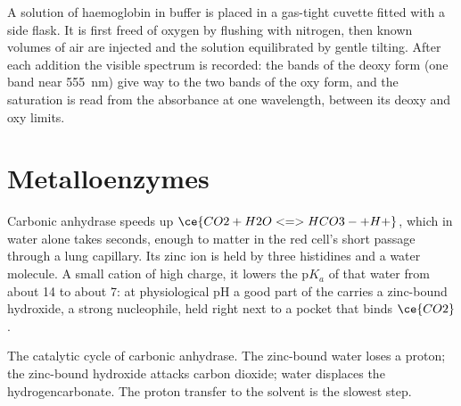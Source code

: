 \begin{inthelab}
A solution of haemoglobin in buffer is placed in a gas-tight cuvette fitted
with a side flask. It is first freed of oxygen by flushing with nitrogen, then
known volumes of air are injected and the solution equilibrated by gentle
tilting. After each addition the visible spectrum is recorded: the bands of
the deoxy form (one band near \qty{555}{nm}) give way to the two bands of the oxy form,
and the saturation is read from the absorbance at one wavelength, between its
deoxy and oxy limits.
\end{inthelab}

\section{Metalloenzymes}

Carbonic anhydrase speeds up $\ce{CO2 + H2O <=> HCO3- + H+}$, which in water alone takes
seconds, enough to matter in the red cell's short passage through a lung
capillary. Its zinc ion is held by three histidines and a water molecule. A
small cation of high charge, it lowers the $\mathrm pK_a$ of that water from about 14 to
about 7: at physiological pH a good part of the  carries a zinc-bound
hydroxide, a strong nucleophile, held right next to a pocket that binds $\ce{CO2}$.

\begin{omfigure}

{\small The catalytic cycle of carbonic anhydrase. The zinc-bound water loses a
proton; the zinc-bound hydroxide attacks carbon dioxide; water displaces the
hydrogencarbonate. The proton transfer to the solvent is the slowest step.}
\end{omfigure}

